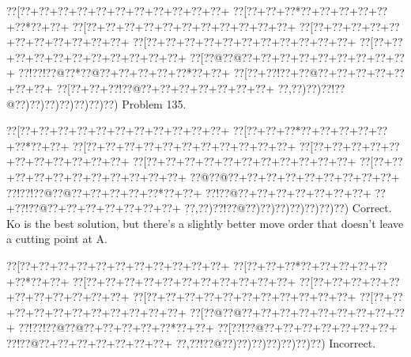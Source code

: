 \documentclass[a5paper]{article}
\begin{document}
\begin{center}
{\goo
\0??[\0??+\0??+\0??+\0??+\0??+\0??+\0??+\0??+\0??+\0??+\0??+
\0??[\0??+\0??+\0??*\0??+\0??+\0??+\0??+\0??+\0??*\0??+\0??+
\0??[\0??+\0??+\0??+\0??+\0??+\0??+\0??+\0??+\0??+\0??+\0??+
\0??[\0??+\0??+\0??+\0??+\0??+\0??+\0??+\0??+\0??+\0??+\0??+
\0??[\0??+\0??+\0??+\0??+\0??+\0??+\0??+\0??+\0??+\0??+\0??+
\0??[\0??+\0??+\0??+\0??+\0??+\0??+\0??+\0??+\0??+\0??+\0??+
\0??[\0??@\0??@\0??+\0??+\0??+\0??+\0??+\0??+\0??+\0??+\0??+
\0??!\0??!\0??@\0??*\0??@\0??+\0??+\0??+\0??+\0??*\0??+\0??+
\0??[\0??+\0??!\0??+\0??@\0??+\0??+\0??+\0??+\0??+\0??+\0??+
\0??[\0??+\0??+\0??!\0??@\0??+\0??+\0??+\0??+\0??+\0??+\0??+
\0??,\0??)\0??)\0??!\0??@\0??)\0??)\0??)\0??)\0??)\0??)\0??)
}
Problem 135.

\end{center}
\begin{center}
{\goo
\0??[\0??+\0??+\0??+\0??+\0??+\0??+\0??+\0??+\0??+\0??+\0??+
\0??[\0??+\0??+\0??*\0??+\0??+\0??+\0??+\0??+\0??*\0??+\0??+
\0??[\0??+\0??+\0??+\0??+\0??+\0??+\0??+\0??+\0??+\0??+\0??+
\0??[\0??+\0??+\0??+\0??+\0??+\0??+\0??+\0??+\0??+\0??+\0??+
\0??[\0??+\0??+\0??+\0??+\0??+\0??+\0??+\0??+\0??+\0??+\0??+
\0??[\0??+\0??+\0??+\0??+\0??+\0??+\0??+\0??+\0??+\0??+\0??+
\0??@\0??@\0??+\0??+\0??+\0??+\0??+\0??+\0??+\0??+\0??+
\0??!\0??!\0??@\0??@\0??+\0??+\0??+\0??+\0??*\0??+\0??+
\0??!\0??@\0??+\0??+\0??+\0??+\0??+\0??+\0??+
\0??+\0??!\0??@\0??+\0??+\0??+\0??+\0??+\0??+\0??+
\0??,\0??)\0??!\0??@\0??)\0??)\0??)\0??)\0??)\0??)\0??)
}
Correct. Ko is the best solution, but there's a slightly better move order that doesn't leave a cutting point at A.

\end{center}
\begin{center}
{\goo
\0??[\0??+\0??+\0??+\0??+\0??+\0??+\0??+\0??+\0??+\0??+\0??+
\0??[\0??+\0??+\0??*\0??+\0??+\0??+\0??+\0??+\0??*\0??+\0??+
\0??[\0??+\0??+\0??+\0??+\0??+\0??+\0??+\0??+\0??+\0??+\0??+
\0??[\0??+\0??+\0??+\0??+\0??+\0??+\0??+\0??+\0??+\0??+\0??+
\0??[\0??+\0??+\0??+\0??+\0??+\0??+\0??+\0??+\0??+\0??+\0??+
\0??[\0??+\0??+\0??+\0??+\0??+\0??+\0??+\0??+\0??+\0??+\0??+
\0??[\0??@\0??@\0??+\0??+\0??+\0??+\0??+\0??+\0??+\0??+\0??+
\0??!\0??!\0??@\0??@\0??+\0??+\0??+\0??+\0??*\0??+\0??+
\0??[\0??!\0??@\0??+\0??+\0??+\0??+\0??+\0??+\0??+
\0??!\0??@\0??+\0??+\0??+\0??+\0??+\0??+\0??+
\0??,\0??!\0??@\0??)\0??)\0??)\0??)\0??)\0??)\0??)
}
Incorrect. 

\end{center}
\end{document}
